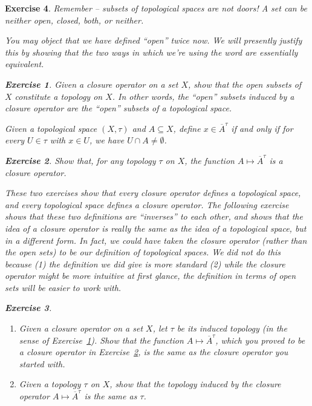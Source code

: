 \documentclass[12pt]{amsart}
\newtheorem{exercise}{Exercise}[section]
\theoremstyle{definition}
\theoremstyle{remark}
\newcommand{\0}{\emptyset}
\newcommand{\closure}[1]{\overline{#1}}
\begin{document}
\begin{exercise}
Remember -- subsets of topological spaces are not doors! A set can be neither open, closed, both, or neither.

You may object that we have defined ``open'' twice now. We will presently justify this by showing that the two ways in which we're using the word are essentially equivalent.

\begin{exercise}\label{ex:closureoperatortotopology}
Given a closure operator on a set $X$, show that the open subsets of $X$ constitute a topology on $X$. In other words, the ``open'' subsets induced by a closure operator are the ``open'' subsets of a topological space.
\end{exercise}

Given a topological space $(X,\tau)$ and $A \subseteq X$, define $x \in \closure{A}^\tau$ if and only if for every $U \in \tau$ with $x \in U$, we have $U \cap A \neq \0$.

\begin{exercise}\label{ex:topologytoclosureoperator}
Show that, for any topology $\tau$ on $X$, the function $A \mapsto \closure{A}^\tau$ is a closure operator.
\end{exercise}

These two exercises show that every closure operator defines a topological space, and every topological space defines a closure operator. The following exercise shows that these two definitions are ``inverses'' to each other, and shows that the idea of a closure operator is really the same as the idea of a topological space, but in a different form. In fact, we could have taken the closure operator (rather than the open sets) to be our definition of topological spaces. We did not do this because (1) the definition we did give is more standard (2) while the closure operator might be more intuitive at first glance, the definition in terms of open sets will be easier to work with.

\begin{exercise}
\begin{enumerate}
\item Given a closure operator on a set $X$, let $\tau$ be its induced topology (in the sense of Exercise~\ref{ex:closureoperatortotopology}). Show that the function $A \mapsto \closure{A}^\tau$, which you proved to be a closure operator in Exercise~\ref{ex:topologytoclosureoperator}, is the same as the closure operator you started with.
\item Given a topology $\tau$ on $X$, show that the topology induced by the closure operator $A \mapsto \closure{A}^\tau$ is the same as $\tau$.
\end{enumerate}
\end{exercise}


\end{exercise}
\end{document}
